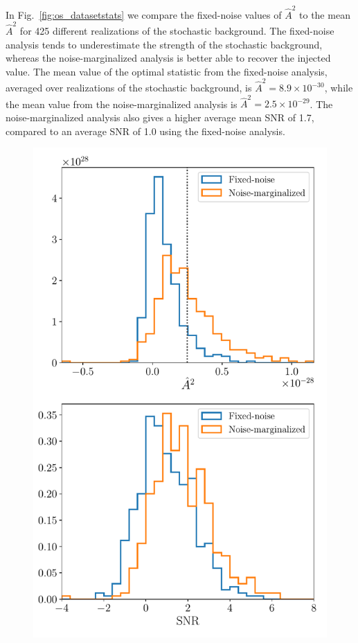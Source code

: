 \documentclass[twocolumn,aps,prd,superscriptaddress]{revtex4-1}
\begin{document}
In Fig.~\ref{fig:os_datasetstats} we compare the fixed-noise values of $\hat{A}^2$ 
to the mean $\hat{A}^2$ for 425 different realizations of the stochastic background. 
The fixed-noise analysis tends to underestimate the strength of the stochastic background, 
whereas the noise-marginalized analysis is better able to recover the injected value. 
The mean value of the optimal statistic from the fixed-noise analysis, 
averaged over realizations of the stochastic background, is $\hat{A}^2 = 8.9 \times 10^{-30}$, 
while the mean value from the noise-marginalized analysis is $\hat{A}^2 = 2.5 \times 10^{-29}$. 
The noise-marginalized analysis also gives a higher average mean SNR of 1.7, 
compared to an average SNR of 1.0 using the fixed-noise analysis.
\begin{figure}[ht]
	\includegraphics[width=0.95\columnwidth]{plots/os_datasetstats_5e-15.pdf}

\end{figure}
\end{document}
